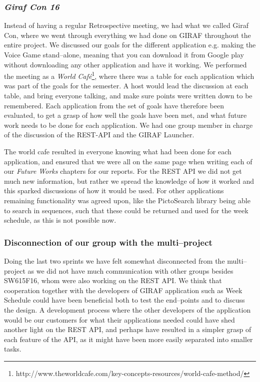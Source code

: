 \subsubsection*{\textit{Giraf Con \'16}}
Instead of having a regular Retrospective meeting, we had what we called Giraf Con, where we went through everything we had done on GIRAF throughout the entire project.
We discussed our goals for the different application e.g. making the Voice Game stand--alone, meaning that you can download it from Google play without downloading any other application and have it working.
We performed the meeting as a \textit{World Café}\footnote{http://www.theworldcafe.com/key-concepts-resources/world-cafe-method/}, where there was a table for each application which was part of the goals for the semester.
A host would lead the discussion at each table, and bring everyone talking, and make sure points were written down to be remembered.
Each application from the set of goals have therefore been evaluated, to get a grasp of how well the goals have been met, and what future work needs to be done for each application.
We had one group member in charge of the discussion of the REST-API and the GIRAF Launcher.

The world cafe resulted in everyone knowing what had been done for each application, and ensured that we were all on the same page when writing each of our \textit{Future Works} chapters for our reports.
For the REST API we did not get much new information, but rather we spread the knowledge of how it worked and this sparked discussions of how it would be used.
For other applications remaining functionality was agreed upon, like the PictoSearch library being able to search in sequences, such that these could be returned and used for the week schedule, as this is not possible now.

\subsubsection*{Disconnection of our group with the multi–project}
Doing the last two sprints we have felt somewhat disconnected from the multi--project as we did not have much communication with other groups besides SW615F16, whom were also working on the REST API.
We think that cooperation together with the developers of GIRAF application such as Week Schedule could have been beneficial both to test the end--points and to discuss the design.
A development process where the other developers of the application would be our customers for what their applications needed could have shed another light on the REST API, and perhaps have resulted in a simpler grasp of each feature of the API, as it might have been more easily separated into smaller tasks.


